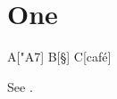 \documentclass{article}
\edef\cc{\the\catcode"A7}
\def\xa{§}
\def\xb{café}
\begin{document}
\section{One}\label{sec:one}
A[\cc] B[\xa] C[\xb]

See .
\end{document}
